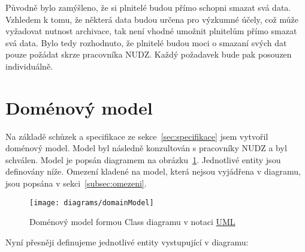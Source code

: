 Původně bylo zamýšleno, že si plnitelé budou přímo schopni smazat svá data.
Vzhledem k tomu, že některá data budou určena pro výzkumné účely, což může vyžadovat nutnost archivace, tak není vhodné umožnit plnitelům přímo smazat svá data.
Bylo tedy rozhodnuto, že plnitelé budou moci o smazaní svých dat pouze požádat skrze pracovníka NUDZ\@.
Každý požadavek bude pak posouzen individuálně.


\section{Doménový model}\label{sec:domenovy-model}

Na základě schůzek a specifikace ze sekce~\ref{sec:specifikace} jsem vytvořil doménový model.
Model byl následně konzultován s pracovníky NUDZ a byl schválen.
Model je popsán diagramem na obrázku~\ref{fig:domain-model}.
Jednotlivé entity jsou definovány níže.
Omezení kladené na model, která nejsou vyjádřena v diagramu, jsou popsána v sekci~\ref{subsec:omezeni}.

\begin{figure}[H]
    \centering
    \texttt{[image: diagrams/domainModel]}
    \caption[Doménový model]{Doménový model formou Class diagramu v notaci \href{https://www.omg.org/spec/UML/2.5.1/PDF}{UML}\footnotemark}\label{fig:domain-model}
\end{figure}


Nyní přesněji definujeme jednotlivé entity vystupující v diagramu:

